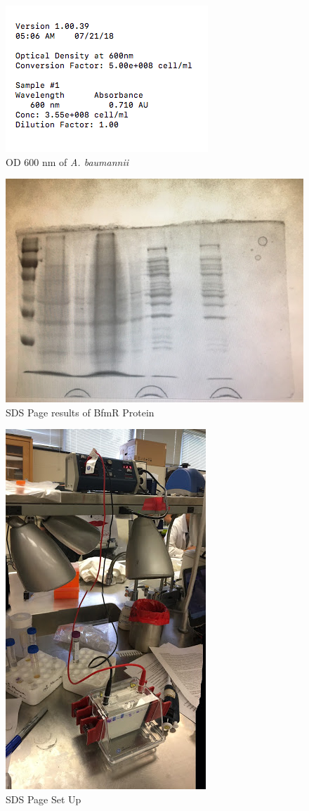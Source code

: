 \documentclass[11pt]{article}
\begin{document}
\begin{figure}[htbp]
\centering
\includegraphics[scale=1.0]{OD-600nm.png}
\caption{OD 600 nm of \emph{A. baumannii}}
\label{fig:OD-600nm}
\end{figure}

\begin{figure}[htbp]
\centering
\includegraphics[scale=0.5]{sds-page-results.jpg}
\caption{SDS Page results of BfmR Protein}
\label{fig:sds-page-results}
\end{figure}


\begin{figure}[htbp]
\centering
\includegraphics[scale=1.0]{sds-page-setup.jpg}
\caption{SDS Page Set Up}
\label{fig:sds-page-setup}
\end{figure}
\end{document}
